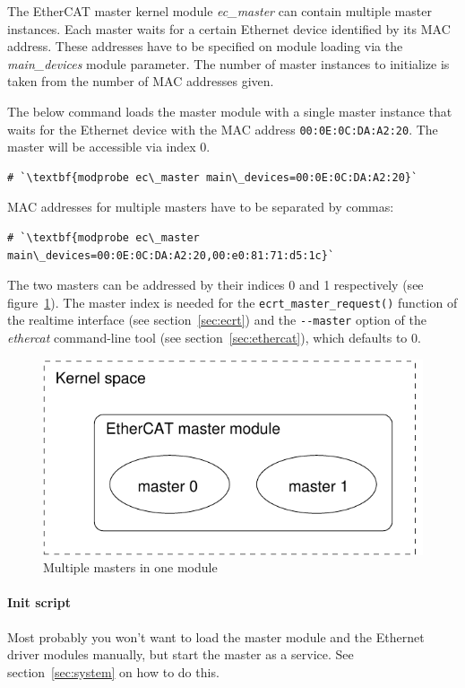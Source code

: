 \documentclass[a4paper,12pt,BCOR6mm,bibtotoc,idxtotoc]{scrbook}
\begin{document}
The EtherCAT master kernel module \textit{ec\_master} can contain multiple
master instances. Each master waits for a certain Ethernet device identified
by its MAC address. These addresses have to be specified on
module loading via the \textit{main\_devices} module parameter. The number of
master instances to initialize is taken from the number of MAC addresses
given.

The below command loads the master module with a single master instance that
waits for the Ethernet device with the MAC address
\lstinline+00:0E:0C:DA:A2:20+. The master will be accessible via index $0$.

\begin{lstlisting}
# `\textbf{modprobe ec\_master main\_devices=00:0E:0C:DA:A2:20}`
\end{lstlisting}

MAC addresses for multiple masters have to be separated by commas:

\begin{lstlisting}
# `\textbf{modprobe ec\_master main\_devices=00:0E:0C:DA:A2:20,00:e0:81:71:d5:1c}`
\end{lstlisting}

The two masters can be addressed by their indices 0 and 1 respectively (see
figure~\ref{fig:masters}). The master index is needed for the
\lstinline+ecrt_master_request()+ function of the realtime interface (see
section~\ref{sec:ecrt}) and the \lstinline+--master+ option of the
\textit{ethercat} command-line tool (see section~\ref{sec:ethercat}), which
defaults to $0$.

\begin{figure}[htbp]
  \centering
  \includegraphics[width=.5\textwidth]{images/masters}
  \caption{Multiple masters in one module}
  \label{fig:masters}
\end{figure}

\paragraph{Init script}

Most probably you won't want to load the master module and the Ethernet driver
modules manually, but start the master as a service. See
section~\ref{sec:system} on how to do this.
\end{document}
